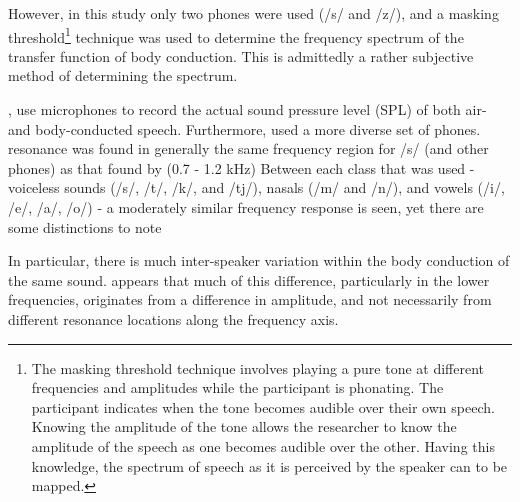 However, in this study only two phones were used (/s/ and /z/), and a masking threshold\footnote{The masking threshold technique involves playing a pure tone at different frequencies and amplitudes while the participant is phonating. The participant indicates when the tone becomes audible over their own speech. Knowing the amplitude of the tone allows the researcher to know the amplitude of the speech as one becomes audible over the other. Having this knowledge, the spectrum of speech as it is perceived by the speaker can to be mapped.} technique was used to determine the frequency spectrum of the transfer function of body conduction.  This is admittedly a rather subjective method of determining the spectrum.  

\cite{reinfeldt:10}, \DIFdelbegin {}\DIFdelend use microphones to record the actual sound pressure level (SPL) of both air- and body-conducted speech. Furthermore, \cite{reinfeldt:10} used a more \DIFdelbegin {}\DIFdelend diverse set of phones.  \DIFdelbegin {}\DIFdelend \DIFaddbegin {}\DIFaddend resonance was found in generally the same frequency region for /s/ (and other phones) as that found by \cite{porschmann:00} (0.7 - 1.2 kHz) \DIFdelbegin {}\DIFdelend \DIFaddbegin {}\DIFaddend Between each class that was used - voiceless sounds (/s/, /t/, /k/, and /tj/),  nasals (/m/ and /n/), and vowels (/i/, /e/, /a/, /o/) - a moderately similar frequency response is seen, yet there are some distinctions to note\DIFdelbegin {}\DIFdelend \DIFaddbegin {}\DIFaddend 

In particular, \DIFdelbegin {}\DIFdelend %
there is much inter-speaker variation within the body conduction of the same sound.  \DIFdelbegin {}\DIFdelend %
\DIFaddbegin {}\DIFaddend appears that much of this difference, particularly in the lower frequencies, originates from a difference in amplitude, and not necessarily from different resonance locations along the frequency axis.  \DIFdelbegin {}\textit{} %
\DIFdelend %

